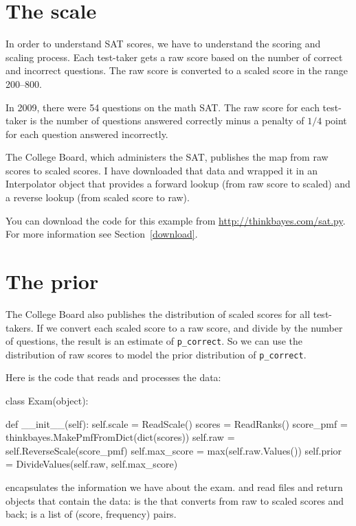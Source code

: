 \documentclass[12pt]{book}
\theoremstyle{exercise}
\begin{document}
\section{The scale}

In order to understand SAT scores, we have to understand the scoring
and scaling process.  Each test-taker gets a raw score based on the
number of correct and incorrect questions.  The raw score is converted
to a scaled score in the range 200--800.

In 2009, there were 54 questions on the math SAT.  The raw score
for each test-taker is the number of questions answered correctly
minus a penalty of $1/4$ point for each question answered incorrectly.

The College Board, which administers the SAT, publishes the
map from raw scores to scaled scores.  I have downloaded that
data and wrapped it in an Interpolator object that provides a forward
lookup (from raw score to scaled) and a reverse lookup (from scaled
score to raw).

You can download the code for this example from
\url{http://thinkbayes.com/sat.py}.
  For more information
see Section~\ref{download}.

\section{The prior}

The College Board also publishes the distribution of scaled scores
for all test-takers.  If we convert each scaled score to a raw score,
and divide by the number of questions, the result is an estimate
of \verb"p_correct".
So we can use the distribution of raw scores to model the
prior distribution of \verb"p_correct".

Here is the code that reads and processes the data:

\begin{code}
class Exam(object):

    def __init__(self):
        self.scale = ReadScale()
        scores = ReadRanks()
        score_pmf = thinkbayes.MakePmfFromDict(dict(scores))
        self.raw = self.ReverseScale(score_pmf)
        self.max_score = max(self.raw.Values())
        self.prior = DivideValues(self.raw, self.max_score)
\end{code}

 encapsulates the information we have about the exam.
 and  read files and return
objects that contain the data:
 is the  that converts
from raw to scaled scores and back;   is a list
of (score, frequency) pairs.
\end{document}
